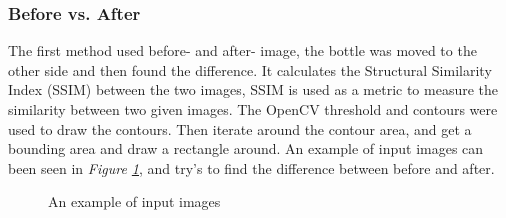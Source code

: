 \subsubsection*{Before vs. After}\label{beforeandafter}
The first method used before- and after- image, the bottle was moved to the other side and then found the difference. It calculates the Structural Similarity Index (SSIM) between the two images, SSIM\cite{datta_all_2020} is used as a metric to measure the similarity between two given images. The OpenCV threshold and contours were used to draw the contours. Then iterate around the contour area, and get a bounding area and draw a rectangle around.
An example of input images can been seen in \textit{Figure \ref{figure: beforeafter}}, and try's to find the difference between before and after.
\begin{figure}[h]
    \centering
    \hfill
    \caption{An example of input images}
    \label{figure: beforeafter}
\end{figure}

